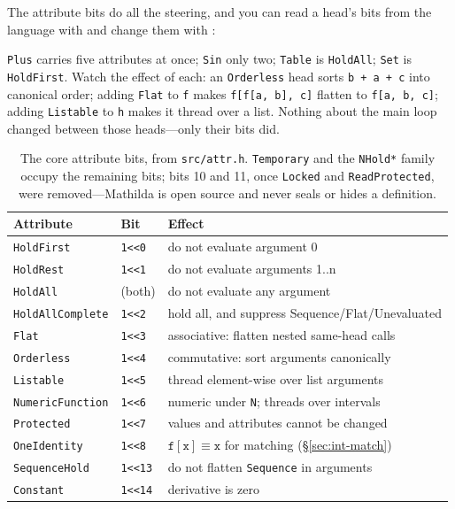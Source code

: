 The attribute bits do all the steering, and you can read a head's bits from the
language with  and change them with :


\texttt{Plus} carries five attributes at once; \texttt{Sin} only two; \texttt{Table}
is \texttt{HoldAll}; \texttt{Set} is \texttt{HoldFirst}. Watch the effect of each: an
\texttt{Orderless} head sorts \texttt{b + a + c} into canonical order; adding
\texttt{Flat} to \texttt{f} makes \texttt{f[f[a, b], c]} flatten to
\texttt{f[a, b, c]}; adding \texttt{Listable} to \texttt{h} makes it thread over a
list. Nothing about the main loop changed between those heads---only their bits did.

\begin{table}[h]
\centering
\small
\begin{tabular}{lll}
\hline
Attribute & Bit & Effect \\
\hline
\texttt{HoldFirst} & \texttt{1<<0} & do not evaluate argument 0 \\
\texttt{HoldRest} & \texttt{1<<1} & do not evaluate arguments 1..n \\
\texttt{HoldAll} & (both) & do not evaluate any argument \\
\texttt{HoldAllComplete} & \texttt{1<<2} & hold all, and suppress Sequence/Flat/Unevaluated \\
\texttt{Flat} & \texttt{1<<3} & associative: flatten nested same-head calls \\
\texttt{Orderless} & \texttt{1<<4} & commutative: sort arguments canonically \\
\texttt{Listable} & \texttt{1<<5} & thread element-wise over list arguments \\
\texttt{NumericFunction} & \texttt{1<<6} & numeric under \texttt{N}; threads over intervals \\
\texttt{Protected} & \texttt{1<<7} & values and attributes cannot be changed \\
\texttt{OneIdentity} & \texttt{1<<8} & \(\mathtt{f[x]}\equiv\mathtt{x}\) for matching (\S\ref{sec:int-match}) \\
\texttt{SequenceHold} & \texttt{1<<13} & do not flatten \texttt{Sequence} in arguments \\
\texttt{Constant} & \texttt{1<<14} & derivative is zero \\
\hline
\end{tabular}
\caption{The core attribute bits, from \texttt{src/attr.h}. \texttt{Temporary}
and the \texttt{NHold*} family occupy the remaining bits; bits 10 and 11, once
\texttt{Locked} and \texttt{ReadProtected}, were removed---Mathilda is open source
and never seals or hides a definition.}
\label{tab:attrs}
\end{table}

